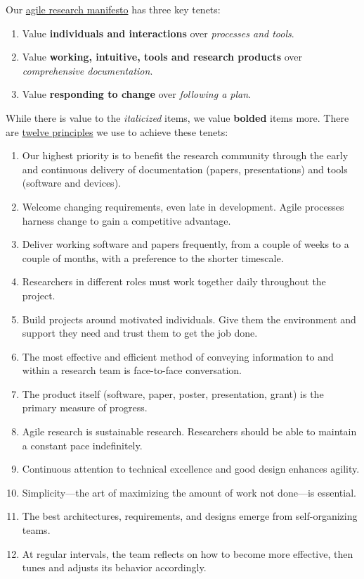 \documentclass{tufte-book} %
\begin{document}
Our \href{http://agilemanifesto.org/}{agile research manifesto} has three key
tenets:
\begin{enumerate}
\item Value \textbf{individuals and interactions} over
  \textit{processes and tools}.
\item Value \textbf{working, intuitive, tools and research products} over
  \textit{comprehensive documentation}.
\item Value \textbf{responding to change} over \textit{following a plan}.
\end{enumerate}
While there is value to the \textit{italicized} items, we value
\textbf{bolded} items more.  There are \href{http://www.agilemanifesto.org/principles.html}{twelve
  principles} we use to achieve these tenets:
\begin{enumerate}
\item Our highest priority is to benefit the research community
  through the early and continuous delivery of documentation (papers,
  presentations) and tools (software and devices).

\item Welcome changing requirements, even late in development.  Agile
  processes harness change to gain a competitive advantage.

\item Deliver working software and papers frequently, from a couple of
  weeks to a couple of months, with a preference to the shorter
  timescale.

\item Researchers in different roles must work together daily
  throughout the project.

\item Build projects around motivated individuals.  Give them the
  environment and support they need and trust them to get the job
  done.

\item The most effective and efficient method of conveying information
  to and within a research team is face-to-face conversation.

\item The product itself (software, paper, poster,
  presentation, grant) is the primary measure of progress.

\item Agile research is sustainable research.  Researchers should
  be able to maintain a constant pace indefinitely.

\item Continuous attention to technical excellence and good design
  enhances agility.

\item Simplicity---the art of maximizing the amount of work not
  done---is essential.

\item The best architectures, requirements, and designs emerge from
  self-organizing teams.

\item At regular intervals, the team reflects on how to become more
  effective, then tunes and adjusts its behavior accordingly.
\end{enumerate}
\end{document}
